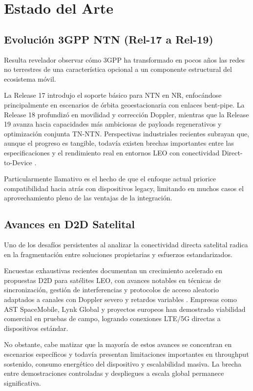 \section{Estado del Arte}

\subsection{Evolución 3GPP NTN (Rel-17 a Rel-19)}

Resulta revelador observar cómo 3GPP ha transformado en pocos años las redes no terrestres de una característica opcional a un componente estructural del ecosistema móvil. 

La Release 17 introdujo el soporte básico para NTN en NR, enfocándose principalmente en escenarios de órbita geoestacionaria con enlaces bent-pipe. La Release 18 profundizó en movilidad y corrección Doppler, mientras que la Release 19 avanza hacia capacidades más ambiciosas de payloads regenerativos y optimización conjunta TN-NTN. Perspectivas industriales recientes subrayan que, aunque el progreso es tangible, todavía existen brechas importantes entre las especificaciones y el rendimiento real en entornos LEO con conectividad Direct-to-Device \cite{Ericsson2025_NTN}.

Particularmente llamativo es el hecho de que el enfoque actual priorice compatibilidad hacia atrás con dispositivos legacy, limitando en muchos casos el aprovechamiento pleno de las ventajas de la integración.

\subsection{Avances en D2D Satelital}

Uno de los desafíos persistentes al analizar la conectividad directa satelital radica en la fragmentación entre soluciones propietarias y esfuerzos estandarizados. 

Encuestas exhaustivas recientes documentan un crecimiento acelerado en propuestas D2D para satélites LEO, con avances notables en técnicas de sincronización, gestión de interferencias y protocolos de acceso aleatorio adaptados a canales con Doppler severo y retardos variables \cite{Pasandi2024_D2DSurvey}. Empresas como AST SpaceMobile, Lynk Global y proyectos europeos han demostrado viabilidad comercial en pruebas de campo, logrando conexiones LTE/5G directas a dispositivos estándar.

No obstante, cabe matizar que la mayoría de estos avances se concentran en escenarios específicos y todavía presentan limitaciones importantes en throughput sostenido, consumo energético del dispositivo y escalabilidad masiva. La brecha entre demostraciones controladas y despliegues a escala global permanece significativa.

